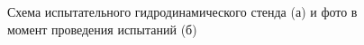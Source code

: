 
\begin{figure}[!ht]
  \begin{minipage}[ht]{0.55\linewidth}
  \end{minipage}
  \hfill
  \begin{minipage}[ht]{0.44\linewidth}
  \end{minipage}
  \caption{Схема испытательного гидродинамического стенда (а) и фото в момент проведения испытаний (б)}
  \label{img:mcl}  
\end{figure}

